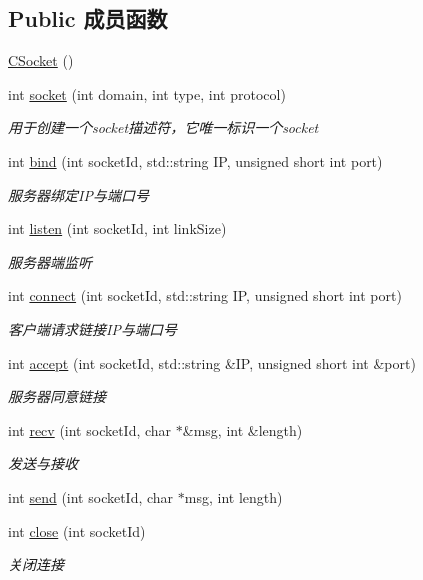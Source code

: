 \subsection*{Public 成员函数}
\begin{DoxyCompactItemize}
\item 
\hyperlink{class_c_socket_a3f5f8efaa44309a1991e72b985a49a33}{C\+Socket} ()
\item 
int \hyperlink{class_c_socket_abc15c93dfbf879f5dacc8b4b5dd951b1}{socket} (int domain, int type, int protocol)
\begin{DoxyCompactList}\small\item\em 用于创建一个socket描述符，它唯一标识一个socket \end{DoxyCompactList}\item 
int \hyperlink{class_c_socket_a498e08712781a360f2cb2279bd1151c4}{bind} (int socket\+Id, std\+::string IP, unsigned short int port)
\begin{DoxyCompactList}\small\item\em 服务器绑定\+I\+P与端口号 \end{DoxyCompactList}\item 
int \hyperlink{class_c_socket_acfbd568b041bb6ac35c5fc862aee28f1}{listen} (int socket\+Id, int link\+Size)
\begin{DoxyCompactList}\small\item\em 服务器端监听 \end{DoxyCompactList}\item 
int \hyperlink{class_c_socket_a7c54f8c3c1fef6dd1c84c105e99ddbb1}{connect} (int socket\+Id, std\+::string IP, unsigned short int port)
\begin{DoxyCompactList}\small\item\em 客户端请求链接\+I\+P与端口号 \end{DoxyCompactList}\item 
int \hyperlink{class_c_socket_aaf0c338bcac7bbb4b9a4e57f62c7e7df}{accept} (int socket\+Id, std\+::string \&IP, unsigned short int \&port)
\begin{DoxyCompactList}\small\item\em 服务器同意链接 \end{DoxyCompactList}\item 
int \hyperlink{class_c_socket_aafbbf6818bd94b8fda58b8a7ee8417c3}{recv} (int socket\+Id, char $\ast$\&msg, int \&length)
\begin{DoxyCompactList}\small\item\em 发送与接收 \end{DoxyCompactList}\item 
int \hyperlink{class_c_socket_ab034dd0ed69981237cc8385a6786d5ab}{send} (int socket\+Id, char $\ast$msg, int length)
\item 
int \hyperlink{class_c_socket_a1af720c8b15569d9f8f6abd91bc1bfe7}{close} (int socket\+Id)
\begin{DoxyCompactList}\small\item\em 关闭连接 \end{DoxyCompactList}\end{DoxyCompactItemize}


